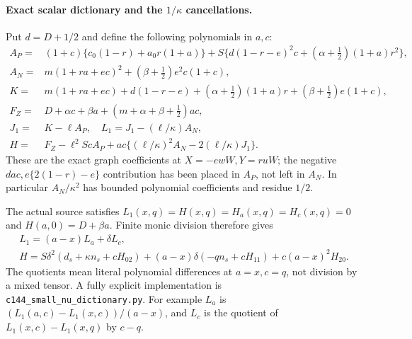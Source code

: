 \paragraph{Exact scalar dictionary and the $1/\kappa$ cancellations.}
Put $d=D+1/2$ and define the following polynomials in $a,c$:
\[
\begin{split}
 A_P={}&(1+c)\{c_0(1-r)+a_0r(1+a)\}
       +S\{d(1-r-e)^2c+(\alpha+\tfrac12)(1+a)r^2\},\\
 A_N={}&m(1+ra+ec)^2+(\beta+\tfrac12)e^2c(1+c),\\
 K={}&m(1+ra+ec)+d(1-r-e)
       +(\alpha+\tfrac12)(1+a)r+(\beta+\tfrac12)e(1+c),\\
 F_Z={}&D+\alpha c+\beta a+(m+\alpha+\beta+\tfrac12)ac,\\
 J_1={}&K-\ell A_P,\quad L_1=J_1-(\ell/\kappa)A_N,\\
 H={}&F_Z-\ell^2ScA_P
                 +ac\{(\ell/\kappa)^2A_N-2(\ell/\kappa)J_1\}.
\end{split}\tag{SN9}
\]
These are the exact graph coefficients at $X=-ewW,Y=ruW$;
the negative $dac,e\{2(1-r)-e\}$ contribution has been placed
in $A_P$, not left in $A_N$. In particular $A_N/\kappa^2$ has
bounded polynomial coefficients and residue $1/2$.

The actual source satisfies
$L_1(x,q)=H(x,q)=H_a(x,q)=H_c(x,q)=0$ and
$H(a,0)=D+\beta a$. Finite monic division therefore gives
\[
\begin{gathered}
 L_1=(a-x)L_a+\delta L_c,\\
 H=S\delta^2(d_s+\kappa n_s+cH_{02})
        +(a-x)\delta(-qn_s+cH_{11})+c(a-x)^2H_{20}.
\end{gathered}\tag{SN10}
\]
The quotients mean literal polynomial differences at $a=x,c=q$,
not division by a mixed tensor. A fully explicit implementation is
\texttt{c144\_small\_nu\_dictionary.py}. For example $L_a$ is
$(L_1(a,c)-L_1(x,c))/(a-x)$, and $L_c$ is the quotient of
$L_1(x,c)-L_1(x,q)$ by $c-q$.

